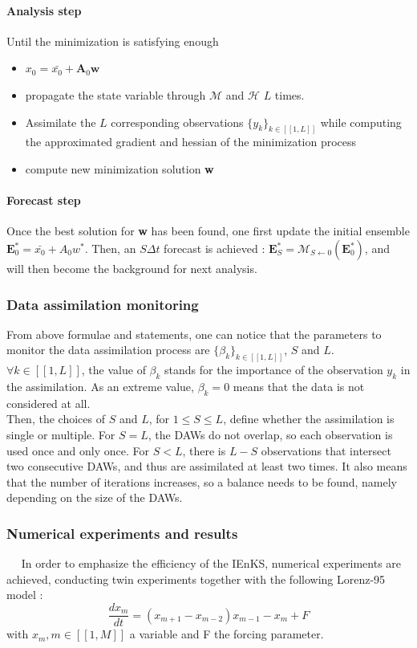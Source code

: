 \documentclass[a4,12pt]{article}
\numberwithin{equation}{section}
\begin{document}
\paragraph{Analysis step}
Until the minimization is satisfying enough
\begin{itemize}
\item $x_0 = \bar{x_0} + \textbf{A}_0 \textbf{w}$
\item propagate the state variable through $\mathcal{M}$ and $\mathcal{H}$ $L$ times.
\item Assimilate the $L$ corresponding observations $\{y_{k}\}_{k \in [\![1,L]\!] }$ while computing the approximated gradient and hessian of the minimization process
\item compute new minimization solution \textbf{w}
\end{itemize}
\paragraph{Forecast step}
Once the best solution for \textbf{w} has been found, one first update the initial ensemble $\textbf{E}^{*}_0 = \bar{x_0} + A_{0}w^{*}$. Then, an $S\Delta t$ forecast is achieved : $\textbf{E}^{*}_S = \mathcal{M}_{S\leftarrow 0}(\textbf{E}^{*}_0)$, and will then become the background for next analysis.


\subsubsection{Data assimilation monitoring}
From above formulae and statements, one can notice that the parameters to monitor the data assimilation process are $\{\beta_k\}_{k \in [\![1,L]\!]}$, $S$ and $L$. \\
$\forall k \in [\![1,L]\!]$, the value of $\beta_k$ stands for the importance of the observation $y_k$ in the assimilation. As an extreme value, $\beta_k = 0$ means that the data is not considered at all. \\
Then, the choices of $S$ and $L$, for $1 \le S \le L$, define whether the assimilation is single or multiple. For $S = L$,  the DAWs do not overlap, so each observation is used once and only once. For $S < L$, there is  $L-S$ observations that intersect two consecutive DAWs, and thus are assimilated at least two times. It also means that the number of iterations increases, so a balance needs to be found, namely depending on the size of the DAWs.

\subsubsection{Numerical experiments and results}
~~ In order to emphasize the efficiency of the IEnKS, numerical experiments are achieved, conducting twin experiments together with the following Lorenz-95 model : \\
\begin{equation*}
\frac{dx_m}{dt} = (x_{m+1}-x_{m-2})x_{m-1} - x_m + F
\end{equation*}
with $x_m, m \in [\![1,M]\!]$ a variable and F the forcing parameter. \\
\end{document}
